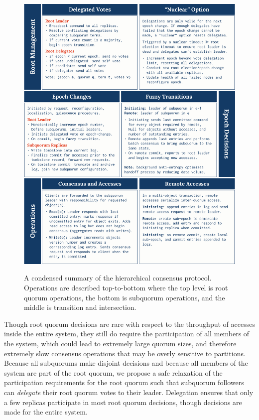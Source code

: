 \begin{figure}
    \begin{center}
        \includegraphics[width=5in]{figures/ch03_hc_operation_summary.pdf}
    \end{center}
    \renewcommand{\baselinestretch}{1}
    \small\normalsize

    \begin{quote}
        \caption[HC Operational Summary]{A condensed summary of the hierarchical consensus protocol. Operations are described top-to-bottom where the top level is root quorum operations, the bottom is subquorum operations, and the middle is transition and intersection.}
        \label{fig:ch03_hc_operation_summary}
    \end{quote}
\end{figure}
\renewcommand{\baselinestretch}{2}
\small\normalsize

Though root quorum decisions are rare with respect to the throughput of accesses inside the entire system, they still do require the participation of all members of the system, which could lead to extremely large quorum sizes, and therefore extremely slow consensus operations that may be overly sensitive to partitions.
Because all subquorums make disjoint decisions and because all members of the system are part of the root quorum, we propose a safe relaxation of the participation requirements for the root quorum such that subquorum followers can \emph{delegate} their root quorum votes to their leader.
Delegation ensures that only a few replicas participate in most root quorum decisions, though decisions are made for the entire system.

